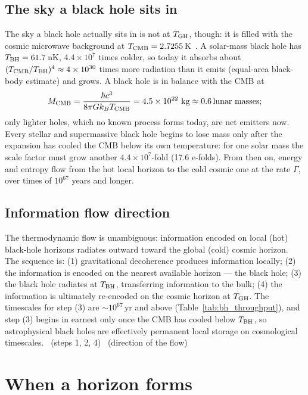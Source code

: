 \subsection{The sky a black hole sits in}
The sky a black hole actually sits in is not at $T_{\rm GH}$, though: it is filled with the cosmic microwave background at $T_{\rm CMB}=2.7255$\,K~\cite{Fixsen2009}. A
solar-mass black hole has $T_{\rm BH}=61.7$\,nK, $4.4\times10^{7}$ times colder, so today it absorbs about $(T_{\rm CMB}/T_{\rm BH})^4\approx4\times10^{30}$
times more radiation than it emits (equal-area black-body estimate) and grows. A black hole is in balance with the CMB at
\begin{equation}M_{\rm CMB}=\frac{\hbar c^3}{8\pi Gk_BT_{\rm CMB}}=4.5\times10^{22}\ \text{kg}\approx0.6\,\text{lunar masses};\end{equation}
only lighter holes, which no known process forms today, are net emitters now. Every stellar and supermassive black hole begins to lose mass only after
the expansion has cooled the CMB below its own temperature: for one solar mass the scale factor must grow another $4.4\times10^{7}$-fold (17.6 e-folds). From then on,
energy and entropy flow from the hot local horizon to the cold cosmic one at the rate $\Gamma$, over times of $10^{67}$ years and longer. \calc

\subsection{Information flow direction}
The thermodynamic flow is unambiguous: information encoded on local (hot) black-hole horizons radiates outward toward the global (cold) cosmic horizon. The
sequence is: (1) gravitational decoherence produces information locally; (2) the information is encoded on the nearest available horizon --- the black hole;
(3) the black hole radiates at $T_{\rm BH}$, transferring information to the bulk; (4) the information is ultimately re-encoded on the cosmic horizon at $T_{\rm GH}$.
The timescales for step (3) are $\sim10^{67}$\,yr and above (Table~\ref{tab:bh_throughput}), and step (3) begins in earnest only once the CMB has cooled below $T_{\rm BH}$, so
astrophysical black holes are effectively permanent local storage on cosmological timescales. \interp\ (steps 1, 2, 4) \derived\ (direction of the flow)

\section{When a horizon forms}\label{sec:bh_formation}
